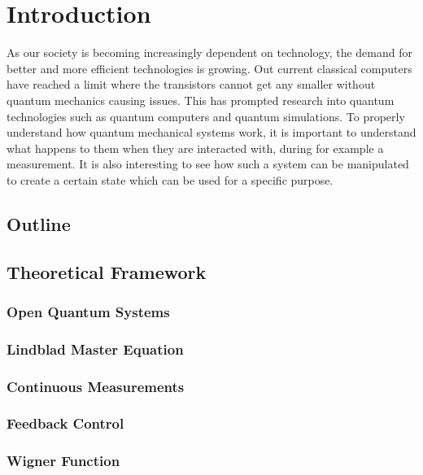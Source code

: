 \section{Introduction}
As our society is becoming increasingly dependent on technology, the demand for better and more efficient technologies is growing. Out current classical computers have reached a limit where the transistors cannot get any smaller without quantum mechanics causing issues. This has prompted research into quantum technologies such as quantum computers and quantum simulations. To properly understand how quantum mechanical systems work, it is important to understand what happens to them when they are interacted with, during for example a measurement. It is also interesting to see how such a system can be manipulated to create a certain state which can be used for a specific purpose. 

\subsection{Outline}


\cite{Annby-Andersson:2024aa}

\subsection{Theoretical Framework}
\subsubsection{Open Quantum Systems}
\subsubsection{Lindblad Master Equation}
\subsubsection{Continuous Measurements}
\subsubsection{Feedback Control}
\subsubsection{Wigner Function}